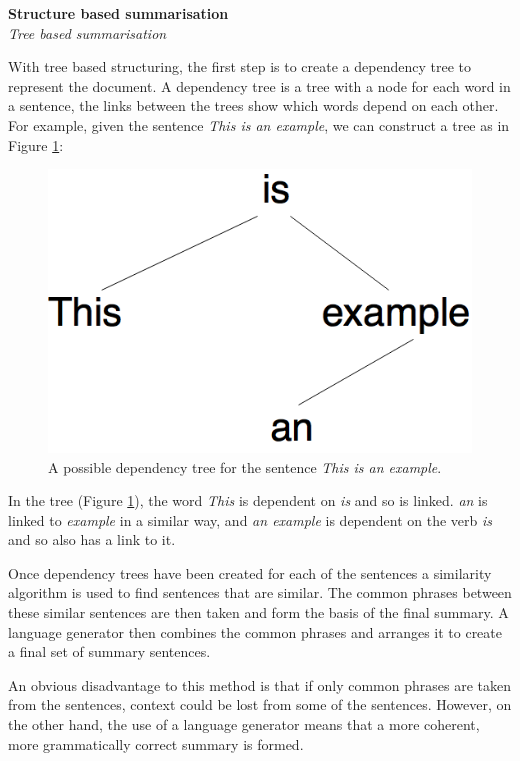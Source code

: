 \documentclass[12pt]{article}
\begin{document}
\textbf{Structure based summarisation} \\

\emph{Tree based summarisation}

With tree based structuring, the first step is to create a dependency tree to represent the document. A dependency tree is a tree with a node for each word in a sentence, the links between the trees show which words depend on each other. For example, given the sentence \emph{This is an example}, we can construct a tree as in Figure \ref{dependencyTree}:

\begin{figure}[ht!]
  \centering
    \includegraphics[scale=0.4]{DependencyTree.png}
   \caption[An example of a Dependency Tree]{A possible dependency tree for the sentence \emph{This is an example}.}
   \label{dependencyTree}
\end{figure}

In the tree (Figure \ref{dependencyTree}), the word \emph{This} is dependent on \emph{is} and so is linked. \emph{an} is linked to \emph{example} in a similar way, and \emph{an example} is dependent on the verb \emph{is} and so also has a link to it. 

Once dependency trees have been created for each of the sentences a similarity algorithm is used to find sentences that are similar. The common phrases between these similar sentences are then taken and form the basis of the final summary. A language generator then combines the common phrases and arranges it to create a final set of summary sentences.

An obvious disadvantage to this method is that if only common phrases are taken from the sentences, context could be lost from some of the sentences. However, on the other hand, the use of a language generator means that a more coherent, more grammatically correct summary is formed. \\
\end{document}
